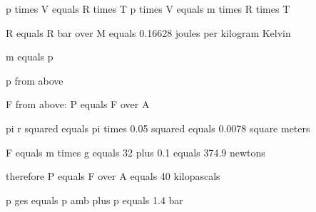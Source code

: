 p times V equals R times T  
p times V equals m times R times T  

R equals R bar over M equals 0.16628 joules per kilogram Kelvin  

m equals p  

p from above  

F from above: P equals F over A  

pi r squared equals pi times 0.05 squared equals 0.0078 square meters  

F equals m times g  
equals  
32 plus 0.1 equals 374.9 newtons  

therefore P equals F over A equals 40 kilopascals  

p ges equals p amb plus p equals 1.4 bar
